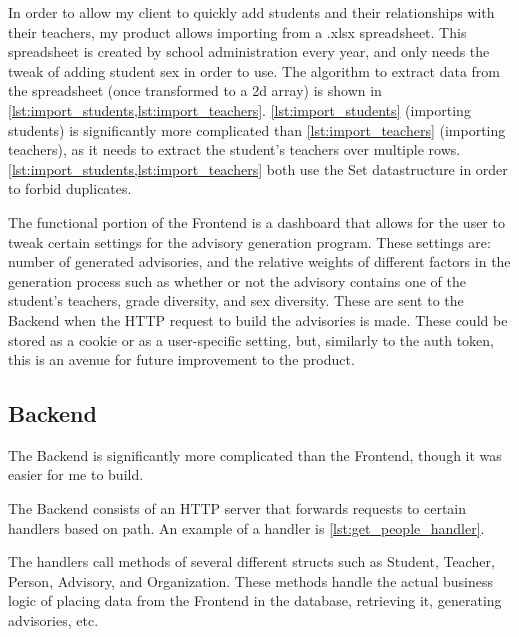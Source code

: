 \documentclass[advisory-ia.tex]{subfiles}
\begin{document}
  In order to allow my client to quickly add students and their relationships with their teachers, my product allows importing from a .xlsx spreadsheet.
  This spreadsheet is created by school administration every year, and only needs the tweak of adding student sex in order to use.
  The algorithm to extract data from the spreadsheet (once transformed to a 2d array) is shown in \cref{lst:import_students,lst:import_teachers}.
  \cref{lst:import_students} (importing students) is significantly more complicated than \cref{lst:import_teachers} (importing teachers), as it needs to extract the student's teachers over multiple rows.
  \cref{lst:import_students,lst:import_teachers} both use the Set datastructure in order to forbid duplicates.



  The functional portion of the Frontend is a dashboard that allows for the user to tweak certain settings for the advisory generation program.
  These settings are: number of generated advisories, and the relative weights of different factors in the generation process such as whether or not the advisory contains one of the student's teachers, grade diversity, and sex diversity.
  These are sent to the Backend when the HTTP request to build the advisories is made.
  These could be stored as a cookie or as a user-specific setting, but, similarly to the auth token, this is an avenue for future improvement to the product.

  \subsection{Backend}
  \label{subsec:Backend}
  The Backend is significantly more complicated than the Frontend, though it was easier for me to build.

  The Backend consists of an HTTP server that forwards requests to certain handlers based on path.
  An example of a handler is \cref{lst:get_people_handler}.


  The handlers call methods of several different structs such as Student, Teacher, Person, Advisory, and Organization.
  These methods handle the actual business logic of placing data from the Frontend in the database, retrieving it, generating advisories, etc.
\end{document}
